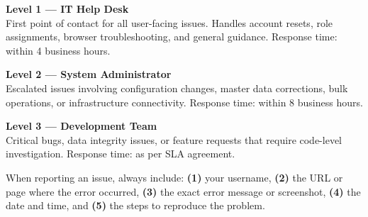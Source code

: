 \begin{ugSteps}
  \item \textbf{Level 1 --- IT Help Desk}\\
    First point of contact for all user-facing issues. Handles
    account resets, role assignments, browser troubleshooting,
    and general guidance. Response time: within 4 business hours.

  \item \textbf{Level 2 --- System Administrator}\\
    Escalated issues involving configuration changes, master
    data corrections, bulk operations, or infrastructure
    connectivity. Response time: within 8 business hours.

  \item \textbf{Level 3 --- Development Team}\\
    Critical bugs, data integrity issues, or feature requests
    that require code-level investigation. Response time: as
    per SLA agreement.
\end{ugSteps}

\begin{ugTip}
  When reporting an issue, always include:
  \textbf{(1)} your username, \textbf{(2)} the URL or page
  where the error occurred, \textbf{(3)} the exact error
  message or screenshot, \textbf{(4)} the date and time,
  and \textbf{(5)} the steps to reproduce the problem.
\end{ugTip}

\newpage
